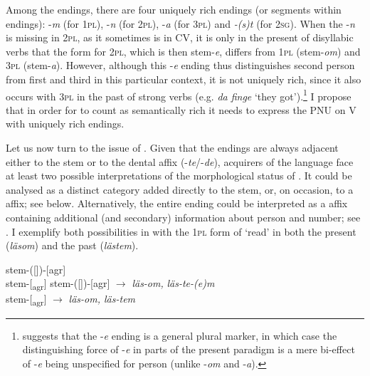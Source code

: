 \documentclass[output=paper,colorlinks,citecolor=brown,draft,draftmode]{langscibook}
\begin{document}
Among the  endings, there are four uniquely rich endings (or segments within endings): -\textit{m} (for 1\textsc{pl}), -\textit{n} (for 2\textsc{pl}), -\textit{a} (for 3\textsc{pl}) and \textit{-(s)t} (for 2\textsc{sg}). When the -\textit{n} is missing in 2\textsc{pl}, as it sometimes is in CV, it is only in the present  of disyllabic verbs that the form for 2\textsc{pl}, which is then stem-\textit{e}, differs from 1\textsc{pl} (stem-\textit{om}) and 3\textsc{pl} (stem-\textit{a}). However, although this -\textit{e} ending thus distinguishes second person from first and third in this particular context, it is not uniquely rich, since it also occurs with 3\textsc{pl} in the past  of strong verbs (e.g. \textit{da finge} ‘they got’).\footnote{\citet{Petzell2017} suggests that the -\textit{e} ending is a general plural marker, in which case the distinguishing force of \nobreakdash-\textit{e} in parts of the present  paradigm is a mere bi-effect of -\textit{e} being unspecified for person (unlike -\textit{om} and -\textit{a}).} I propose that in order for  to count as semantically rich it needs to express the PNU on V with uniquely rich endings.



Let us now turn to the issue of . Given that the   endings are always adjacent either to the stem or to the dental  affix (-\textit{te}/-\textit{de}), acquirers of the language face at least two possible interpretations of the morphological status of . It could be analysed as a distinct category added directly to the stem, or, on occasion, to a  affix; see  below. Alternatively, the entire ending could be interpreted as a  affix containing additional (and secondary) information about person and number; see . I exemplify both possibilities in  with the 1\textsc{pl} form of ‘read’ in both the present (\textit{läsom}) and the past  (\textit{lästem}).


\ea\label{ex:petzell:26}
\ea\label{ex:petzell:26a}  stem-([])-[agr]\\
\ex\label{ex:petzell:26b}  stem-[\textsubscript{agr}]
\z
\ex\label{ex:petzell:27}
\ea\label{ex:petzell:27a}  stem-([])-[agr]  $\to$ \textit{läs-om,} \textit{läs-te-(e)m}\\
\ex\label{ex:petzell:27b}  stem-[\textsubscript{agr}]      $\to$ \textit{läs-om, läs-tem}
\z
\z
\end{document}
